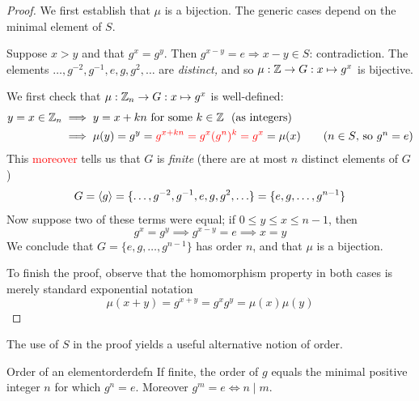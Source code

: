\begin{proof}
	We first establish that $\mu$ is a bijection. The generic cases depend on the minimal element of $S$.
	\begin{description}\itemsep2pt
		\item[Case 1: $S=\emptyset$.]\quad Suppose $x>y$ and that $g^x=g^y$. Then $g^{x-y}=e\Longrightarrow x-y\in S$: contradiction. The elements $\ldots,g^{-2},g^{-1},e,g,g^2,\ldots$ are \emph{distinct,} and so $\mu:\mathbb{Z}\to G:x\mapsto g^x$ is bijective.
		\item[Case 2: $\min S=n$.]\quad We first check that $\mu:\mathbb{Z}_n\to G:x\mapsto g^x$ is well-defined:
		\begin{align*}
			y=x\in\mathbb{Z}_n&\implies y=x+kn\text{ for some $k\in\mathbb{Z}$ \ (as integers)}\\
			&\implies \mu(y) =g^y =\textcolor{red}{g^{x+kn}=g^x(g^n)^k =g^x} =\mu(x) \tag{$n\in S$, so $g^n=e$}
		\end{align*}
		This \textcolor{red}{moreover} tells us that $G$ is \emph{finite} (there are at most $n$ distinct elements of $G$)
		\[
			G=\left\langle g\right\rangle =\{\ldots,g^{-2},g^{-1},e,g,g^2,\ldots\} =\{e,g,\ldots,g^{n-1}\}
		\]
		Now suppose two of these terms were equal; if $0\le y\le x\le n-1$, then
		\[
			g^x=g^y\implies g^{x-y}=e\implies x=y \tag{$0\le x-y\le n-1<n=\min S$}
		\]
		We conclude that $G=\{e,g,\ldots,g^{n-1}\}$ has order $n$, and that $\mu$ is a bijection.
	\end{description}\medskip
	To finish the proof, observe that the homomorphism property in both cases is merely standard exponential notation
	\[
		\mu(x+y)=g^{x+y}=g^xg^y=\mu(x)\mu(y)\tag*{\qedhere}
	\]
\end{proof}

\goodbreak

The use of $S$ in the proof yields a useful alternative notion of order.

\begin{cor}{Order of an element}{orderdefn}
	If finite, the order of $g$ equals the minimal positive integer $n$ for which $g^n=e$. Moreover $g^m=e\Longleftrightarrow n\mid m$.
\end{cor}



